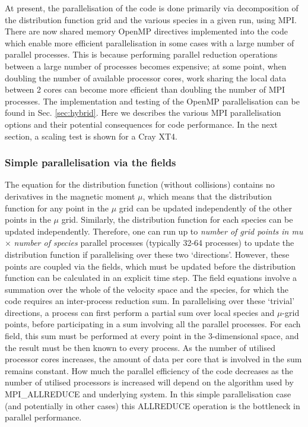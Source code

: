 At present, the parallelisation of the code is done primarily via decomposition
of the distribution function grid and the various species in a given run, using
MPI. There are now shared memory OpenMP directives implemented into the code
which enable more efficient parallelisation in some cases with a large number
of parallel processes. This is because performing parallel reduction operations
between a large number of processes becomes expensive; at some point, when
doubling the number of available processor cores, work sharing the local data
between 2 cores can become more efficient than doubling the number of MPI
processes.
The implementation and testing of the OpenMP parallelisation can be
found in Sec. \ref{sec:hybrid}. Here we describes the various
MPI parallelisation options and their potential consequences for code
performance. In the next section, a scaling test is shown for a Cray XT4.

\subsubsection{Simple parallelisation via the fields}

The equation for the distribution function
(without collisions) contains no derivatives in the magnetic moment $\mu$, which means that the distribution function for any
point in the $\mu$ grid can be updated independently of the other points in the $\mu$ grid. Similarly, the distribution
function for each species can be updated independently. Therefore, one can run up to
{\it number of grid points in mu} $\times$ {\it number of species} parallel processes (typically 32-64 processes) to update
the distribution function if parallelising over these two `directions'.
However, these points are coupled via the fields, which must be updated before the distribution
function can be calculated in an explicit time step. The field equations 
involve a summation over the whole of the velocity space and the species, for which the code requires
an inter-process reduction sum. In parallelising over these `trivial' directions, a process
can first perform a partial sum over local species and $\mu$-grid points, before participating in a sum
involving all the parallel processes. For each field, this sum must be performed at every point in the
3-dimensional space, and the result must be then known to every process. As the number of utilised processor cores increases, the
amount of data per core that is involved in the sum remains constant. How much the parallel efficiency of the code decreases
as the number of utilised processors is increased will depend on the algorithm used by MPI_ALLREDUCE and underlying system.
In this simple parallelisation case (and potentially in other cases) this ALLREDUCE operation is the bottleneck in parallel performance.

